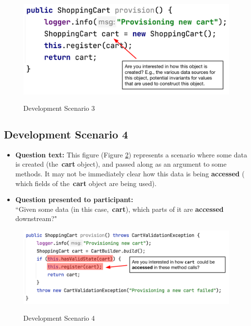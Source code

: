 \begin{figure}[ht]
\centering
\caption{Development Scenario 3}
\includegraphics[width=\textwidth]{./figs/ds3.png}
\label{fig:DS3}
\end{figure}

\subsection{Development Scenario 4}

\begin{itemize}
  \item[] \textbf{Question text:} This figure (Figure \ref{fig:DS4}) represents 
          a scenario where some data is created (the \textbf{cart} object), and
          passed along as an argument to some methods. It may not be 
          immediately clear how this data is being \textbf{accessed} (\eg 
          which fields of the \textbf{cart} object are being used).
  \item[] \textbf{Question presented to participant:}  \\
          ``Given some data (in this case, \textbf{cart}), which parts of it
          are \textbf{accessed} downstream?"
\end{itemize}

\begin{figure}[ht]
\centering
\caption{Development Scenario 4}
\includegraphics[width=\textwidth]{./figs/ds4.png}
\label{fig:DS4}
\end{figure}

